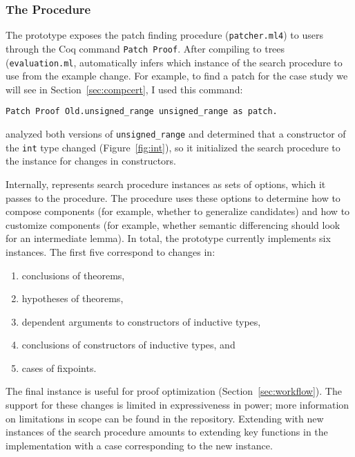 \subsubsection{The Procedure}
\label{sec:pumpkin-impl-procedure}

The \sysname prototype exposes the patch finding procedure (\lstinline{patcher.ml4}) to users through the Coq command \lstinline{Patch Proof}. 
After compiling to trees (\lstinline{evaluation.ml},
\sysname automatically infers which instance of the search procedure to use from the example change. %
For example, to find a patch for the case study we will see in Section~\ref{sec:compcert}, I
used this command: %

\begin{lstlisting}[language=ml4]
  Patch Proof Old.unsigned_range unsigned_range as patch.
\end{lstlisting}
\sysname analyzed both versions of \lstinline{unsigned_range} and determined 
that a constructor of the \lstinline{int} type changed (Figure~\ref{fig:int}),
so it initialized the search procedure to the instance for changes in constructors.

Internally, \sysname represents search procedure instances as sets of options,
which it passes to the procedure. The procedure uses these options to determine
how to compose components (for example, whether to generalize candidates) 
and how to customize components (for example, whether semantic differencing should look for an intermediate lemma).
In total, the \sysname prototype currently implements six instances.
The first five correspond to changes in:

\begin{enumerate}
\item conclusions of theorems,
\item hypotheses of theorems,
\item dependent arguments to constructors of inductive types, 
\item conclusions of constructors of inductive types, and
\item cases of fixpoints.
\end{enumerate}
The final instance is useful for proof optimization (Section~\ref{sec:workflow}).
The support for these changes is limited in expressiveness in power;
more information on limitations in scope can be found in the repository. %
Extending \sysname with new instances of the search procedure amounts to extending key functions in the implementation
with a case corresponding to the new instance.

